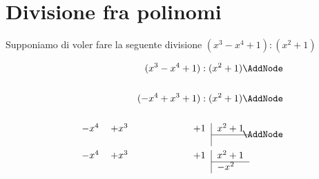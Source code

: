 \section{Divisione fra polinomi}
\begin{esempio}
Supponiamo di voler fare la seguente divisione $(x^3-x^4+1):(x^2+1)$
\begin{NodesList}
\begin{align*}
(x^3-x^4+1):(x^2+1)&\AddNode\\
&\\
(-x^4+x^3+1):(x^2+1)&\AddNode\\
&\\
\begin{minipage}[t]{0.5\textwidth}
\begin{tabular}{lllll|l}
$-x^4$& $+x^3$ & \phantom{$-x^2$} &\phantom{$-x$}  &$+1$&$ x^2+1$\\ 
\cline{6-6}&&&&&
\\
\end{tabular}
\end{minipage}&\AddNode\\
\begin{minipage}[t]{0.5\textwidth}
\begin{tabular}{lllll|l}
$-x^4$& $+x^3$ &\phantom{$-x^2$}  &\phantom{$-x$}  &$+1$&$ x^2+1$\\ 
\cline{6-6}&&&&&$-x^2$
\\
\end{tabular}

\end{minipage}
\end{align*}
\end{NodesList}
\end{esempio}
